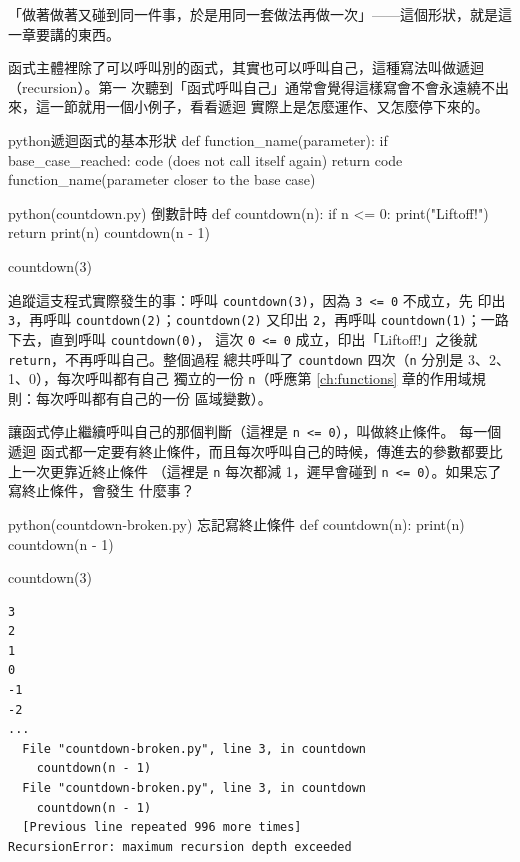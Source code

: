 「做著做著又碰到同一件事，於是用同一套做法再做一次」——這個形狀，就是這一章要講的東西。

函式主體裡除了可以呼叫別的函式，其實也可以呼叫自己，這種寫法叫做遞迴（recursion）。第一
次聽到「函式呼叫自己」通常會覺得這樣寫會不會永遠繞不出來，這一節就用一個小例子，看看遞迴
實際上是怎麼運作、又怎麼停下來的。

\begin{code}{python}{遞迴函式的基本形狀}
def function_name(parameter):
    if base_case_reached:
        code (does not call itself again)
        return
    code
    function_name(parameter closer to the base case)
\end{code}

\begin{example}{python}{(countdown.py) 倒數計時}
def countdown(n):
    if n <= 0:
        print("Liftoff!")
        return
    print(n)
    countdown(n - 1)


countdown(3)
\end{example}


追蹤這支程式實際發生的事：呼叫 \texttt{countdown(3)}，因為 \texttt{3 <= 0} 不成立，先
印出 \texttt{3}，再呼叫 \texttt{countdown(2)}；\texttt{countdown(2)} 又印出
\texttt{2}，再呼叫 \texttt{countdown(1)}；一路下去，直到呼叫 \texttt{countdown(0)}，
這次 \texttt{0 <= 0} 成立，印出「Liftoff!」之後就 \texttt{return}，不再呼叫自己。整個過程
總共呼叫了 \texttt{countdown} 四次（\texttt{n} 分別是 3、2、1、0），每次呼叫都有自己
獨立的一份 \texttt{n}（呼應第 \ref{ch:functions} 章的作用域規則：每次呼叫都有自己的一份
區域變數）。

讓函式停止繼續呼叫自己的那個判斷（這裡是 \texttt{n <= 0}），叫做終止條件。
每一個遞迴
函式都一定要有終止條件，而且每次呼叫自己的時候，傳進去的參數都要比上一次更靠近終止條件
（這裡是 \texttt{n} 每次都減 1，遲早會碰到 \texttt{n <= 0}）。如果忘了寫終止條件，會發生
什麼事？

\begin{example}{python}{(countdown-broken.py) 忘記寫終止條件}
def countdown(n):
    print(n)
    countdown(n - 1)


countdown(3)
\end{example}

\begin{verbatim}
3
2
1
0
-1
-2
...
  File "countdown-broken.py", line 3, in countdown
    countdown(n - 1)
  File "countdown-broken.py", line 3, in countdown
    countdown(n - 1)
  [Previous line repeated 996 more times]
RecursionError: maximum recursion depth exceeded
\end{verbatim}

